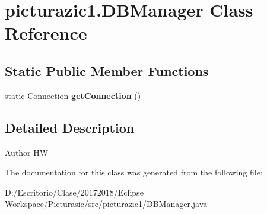 \hypertarget{classpicturazic1_1_1_d_b_manager}{}\section{picturazic1.\+D\+B\+Manager Class Reference}
\label{classpicturazic1_1_1_d_b_manager}
\subsection*{Static Public Member Functions}
\begin{DoxyCompactItemize}
\item 
\mbox{\label{classpicturazic1_1_1_d_b_manager_a8f88c3dfad4434f6704a272bfb031fa6}} 
static Connection {\bfseries get\+Connection} ()
\end{DoxyCompactItemize}


\subsection{Detailed Description}
\begin{DoxyAuthor}{Author}
HW 
\end{DoxyAuthor}


The documentation for this class was generated from the following file\+:\begin{DoxyCompactItemize}
\item 
D\+:/\+Escritorio/\+Clase/20172018/\+Eclipse Workspace/\+Picturasic/src/picturazic1/D\+B\+Manager.\+java\end{DoxyCompactItemize}
